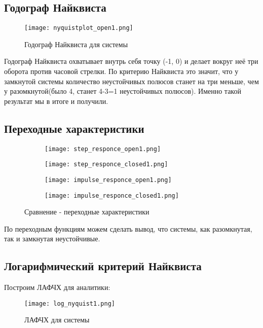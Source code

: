 \newpage
\subsection{Годограф Найквиста}
\begin{figure}[ht]
    \centering
    \texttt{[image: nyquistplot\_open1.png]}
    \caption{Годограф Найквиста для системы}
  \end{figure}

Годограф Найквиста охватывает внутрь себя точку (-1, 0) и делает вокруг неё три оборота против часовой стрелки. 
По критерию Найквиста это значит, что у замкнутой системы количество неустойчивых полюсов станет на три меньше, чем у разомкнутой(было 4, станет 4-3=1 неустойчивых полюсов). 
Именно такой результат мы в итоге и получили.

\subsection{Переходные характеристики}

\begin{figure}[hbt!]
  \begin{subfigure}{.500\linewidth}
    \texttt{[image: step\_responce\_open1.png]}
    \caption{}
  \end{subfigure}\hfill %
  \begin{subfigure}{.500\linewidth}
    \texttt{[image: step\_responce\_closed1.png]}
    \caption{}
  \end{subfigure}
  
  \medskip 
  \begin{subfigure}{.500\linewidth}
    \texttt{[image: impulse\_responce\_open1.png]}
    \caption{}
  \end{subfigure}\hfill 
  \begin{subfigure}{.500\linewidth}
    \texttt{[image: impulse\_responce\_closed1.png]}
    \caption{}
  \end{subfigure}
  
  \caption{Сравнение - переходные характеристики}
  \label{fig:roc}
  \end{figure}
По переходным функциям можем сделать вывод, что системы, как разомкнутая, так и замкнутая неустойчивые.

\newpage
\subsection{Логарифмический критерий Найквиста}
Построим ЛАФЧХ для аналитики:
\begin{figure}[ht]
    \centering
    \texttt{[image: log\_nyquist1.png]}
    \caption{ЛАФЧХ для системы}
  \end{figure}

